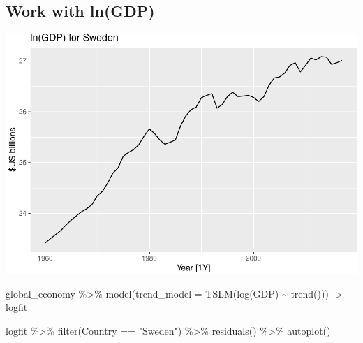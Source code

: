 \documentclass[
]{book}
\newenvironment{Shaded}{\begin{snugshade}}{\end{snugshade}}
\newcommand{\AttributeTok}[1]{\textcolor[rgb]{0.77,0.63,0.00}{#1}}
\newcommand{\FunctionTok}[1]{\textcolor[rgb]{0.00,0.00,0.00}{#1}}
\newcommand{\NormalTok}[1]{#1}
\newcommand{\OtherTok}[1]{\textcolor[rgb]{0.56,0.35,0.01}{#1}}
\newcommand{\SpecialCharTok}[1]{\textcolor[rgb]{0.00,0.00,0.00}{#1}}
\newcommand{\StringTok}[1]{\textcolor[rgb]{0.31,0.60,0.02}{#1}}
\begin{document}
\hypertarget{work-with-lngdp-1}{%
\subsection{Work with ln(GDP)}\label{work-with-lngdp-1}}

\begin{Shaded}
\end{Shaded}

\includegraphics{graphics/unnamed-chunk-62-1.pdf}

\begin{Shaded}
\begin{Highlighting}[]
\NormalTok{global\_economy }\SpecialCharTok{\%\textgreater{}\%}
  \FunctionTok{model}\NormalTok{(}\AttributeTok{trend\_model =} \FunctionTok{TSLM}\NormalTok{(}\FunctionTok{log}\NormalTok{(GDP) }\SpecialCharTok{\textasciitilde{}} \FunctionTok{trend}\NormalTok{())) }\OtherTok{{-}\textgreater{}}\NormalTok{ logfit}
\end{Highlighting}
\end{Shaded}

\begin{Shaded}
\begin{Highlighting}[]
\NormalTok{logfit }\SpecialCharTok{\%\textgreater{}\%} \FunctionTok{filter}\NormalTok{(Country }\SpecialCharTok{==} \StringTok{"Sweden"}\NormalTok{) }\SpecialCharTok{\%\textgreater{}\%} \FunctionTok{residuals}\NormalTok{() }\SpecialCharTok{\%\textgreater{}\%} \FunctionTok{autoplot}\NormalTok{()}
\end{Highlighting}
\end{Shaded}
\end{document}
